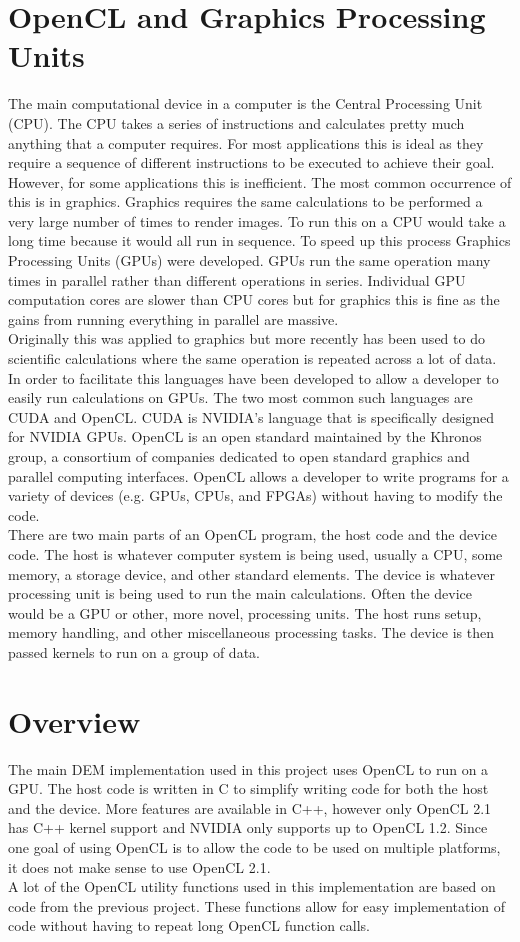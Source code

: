 \documentclass[10pt,a4paper,titlepage]{report}
\begin{document}
\section{OpenCL and Graphics Processing Units}
The main computational device in a computer is the Central Processing Unit (CPU). The CPU takes a series of instructions and calculates pretty much anything that a computer requires. For most applications this is ideal as they require a sequence of different instructions to be executed to achieve their goal. However, for some applications this is inefficient. The most common occurrence of this is in graphics. Graphics requires the same calculations to be performed a very large number of times to render images. To run this on a CPU would take a long time because it would all run in sequence. To speed up this process Graphics Processing Units (GPUs) were developed. GPUs run the same operation many times in parallel rather than different operations in series. Individual GPU computation cores are slower than CPU cores but for graphics this is fine as the gains from running everything in parallel are massive.
\\Originally this was applied to graphics but more recently has been used to do scientific calculations where the same operation is repeated across a lot of data. In order to facilitate this languages have been developed to allow a developer to easily run calculations on GPUs. The two most common such languages are CUDA and OpenCL. CUDA is NVIDIA's language that is specifically designed for NVIDIA GPUs. OpenCL is an open standard maintained by the Khronos group, a consortium of companies dedicated to open standard graphics and parallel computing interfaces. OpenCL allows a developer to write programs for a variety of devices (e.g. GPUs, CPUs, and FPGAs) without having to modify the code.
\\There are two main parts of an OpenCL program, the host code and the device code. The host is whatever computer system is being used, usually a CPU, some memory, a storage device, and other standard elements. The device is whatever processing unit is being used to run the main calculations. Often the device would be a GPU or other, more novel, processing units. The host runs setup, memory handling, and other miscellaneous processing tasks. The device is then passed kernels to run on a group of data.
\section{Overview}
The main DEM implementation used in this project uses OpenCL to run on a GPU. The host code is written in C to simplify writing code for both the host and the device. More features are available in C++, however only OpenCL 2.1 has C++ kernel support and NVIDIA only supports up to OpenCL 1.2. Since one goal of using OpenCL is to allow the code to be used on multiple platforms, it does not make sense to use OpenCL 2.1.
\\A lot of the OpenCL utility functions used in this implementation are based on code from the previous project\cite{achow}. These functions allow for easy implementation of code without having to repeat long OpenCL function calls.
\end{document}
